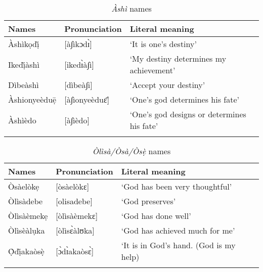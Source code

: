 \documentclass[output=paper]{langscibook}
\begin{document}
\begin{table}[p]
\caption{\label{tab:owaleke:3.3} \textit{Àshì} names}
\begin{tabularx}{\textwidth}{llQ}
\lsptoprule
Names            & Pronunciation         & Literal meaning  \\
\midrule
Àshìkọdị̀     & {[}à∫ìkɔdɪ̀{]}      & ‘It is one’s destiny’         \\
Ikedị̀àshì & {[}ikedɪ̀à∫ì{]}     & ‘My destiny determines my achievement’     \\
Dìbeàshì       & {[}dìbeà∫i{]}       & ‘Accept your destiny’                      \\
Àshionyeèduẹ̄ & {[}à∫ìonyeèduɛ̄{]} & ‘One’s god determines his fate’            \\
Àshìèdo       & {[}à∫ìèdo{]}      & ‘One’s god designs or determines his fate’ \\
\lspbottomrule
\end{tabularx}
\end{table}

\begin{table}[p]
\caption{\label{tab:owaleke:3.4} \textit{Ànị̀ } names}
\end{table}

\begin{table}[p]
\caption{\label{tab:owaleke:3.5}\textit{Òlìsà/Òsà/Òsẹ̀ } names}
\begin{tabularx}{\textwidth}{llQ}
\lsptoprule
Names             & Pronunciation         & Literal meaning\\
\midrule
Òsàelòkẹ    &     [òsàelòkɛ]    &     ‘God has been very thoughtful’\\
Òlìsàdebe   &        [olisadebe]       &       ‘God preserves’\\
Òlìsàèmekẹ &     [òlìsàèmekɛ]   &  ‘God has done well’\\
Òlìsèàlụka   &    [òlìsɛ̀àlʊka]   &    ‘God has achieved much for me’\\
Ọ̀dị̀akaòsẹ̀ &      [ɔ̀dɪ̀akaòsɛ̀]  &       ‘It is in God’s hand. (God is my help) \\
\lspbottomrule
\end{tabularx}
\end{table}
\end{document}
